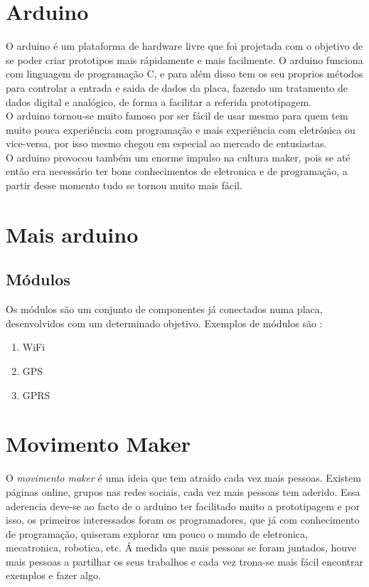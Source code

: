 \documentclass{article}
\begin{document}
\section{Arduino}
O arduino é um plataforma de hardware livre que foi projetada com o objetivo de se poder criar prototipos mais rápidamente e mais facilmente. O arduino funciona com linguagem de programação C, e para além disso tem os seu proprios métodos para controlar a entrada e saida de dados da placa, fazendo um tratamento de dados digital e analógico, de forma a facilitar a referida prototipagem.\newline \\
O arduino tornou-se muito famoso por ser fácil de usar mesmo para quem tem muito pouca experiência com programação e mais experiência com eletrónica ou vice-versa, por isso mesmo chegou em especial ao mercado de entusiastas.\newline \\
O arduino provocou também um enorme impulso na cultura maker, pois se até então era necessário ter bons conhecimentos de eletronica e de programação, a partir desse momento tudo se tornou muito mais fácil.\newline \\

\section{Mais arduino}

\subsection{Módulos}
Os módulos são um conjunto de componentes já conectados numa placa, desenvolvidos com um determinado objetivo. Exemplos de módulos são :
\begin{enumerate}
\item WiFi
\item GPS
\item GPRS
\end{enumerate}

\section{Movimento Maker}
O \textit{movimento maker} é uma ideia que tem atraido cada vez mais pessoas. Existem páginas online, grupos nas redes sociais, cada vez mais pessoas tem aderido. Essa aderencia deve-se ao facto de o arduino ter facilitado muito a prototipagem e por isso, os primeiros interessados foram os programadores, que já com conhecimento de programação, quiseram explorar um pouco o mundo de eletronica, mecatronica, robotica, etc.\newline
Á medida que mais pessoas se foram juntados, houve mais pessoas a partilhar os seus trabalhos e cada vez trona-se mais fácil encontrar exemplos e fazer algo.
\end{document}
